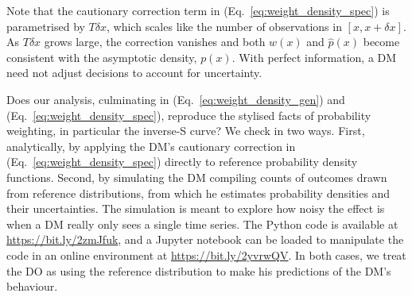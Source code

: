 \documentclass[a4paper, 12pt]{article}
\newcommand{\eref}[1]{(Eq.~\ref{eq:#1})}
\newcommand{\phat}{\hat{p}}
\newcommand{\MK}[1]{\textcolor{red}{\textit{***MK: #1 MK***}}}
\begin{document}
Note that the cautionary correction term in \eref{weight_density_spec} is parametrised by $T\delta x$, which scales like the number of observations in $[x, x+\delta x]$. As $T\delta x$ grows large, the correction vanishes and both $w(x)$ and $\phat(x)$ become consistent with the asymptotic density, $p(x)$. With perfect information, a DM need not adjust decisions to account for uncertainty.

Does our analysis, culminating in \eref{weight_density_gen} and \eref{weight_density_spec}, reproduce the stylised facts of probability weighting, in particular the inverse-S curve? We check in two ways. First, analytically, by applying the DM's cautionary correction in \eref{weight_density_spec} directly to reference probability density functions. Second, by simulating the DM compiling counts of outcomes drawn from reference distributions, from which he estimates probability densities and their uncertainties. The simulation is meant to explore how noisy the effect is when a DM really only sees a single time series. The Python code is available at \url{https://bit.ly/2zmJfuk}, and a Jupyter notebook can be loaded to manipulate the code in an online environment at \url{https://bit.ly/2yvrwQV}. In both cases, we treat the DO as using the reference distribution to make his predictions of the DM's behaviour.
\end{document}
